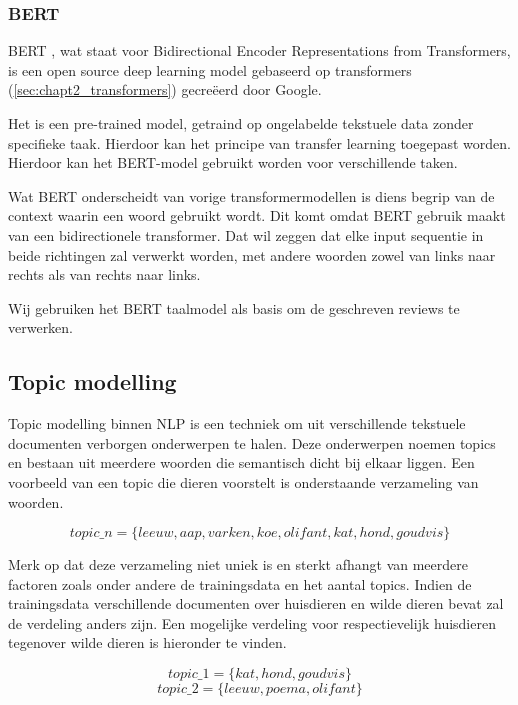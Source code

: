 
\subsubsection{BERT}
\label{sec:chapt2_bert}
BERT \cite{BERT_paper}, wat staat voor Bidirectional Encoder Representations from Transformers, is een open source deep learning model gebaseerd op transformers (\ref{sec:chapt2_transformers}) gecreëerd door Google.

Het is een pre-trained model, getraind op ongelabelde tekstuele data zonder specifieke taak. Hierdoor kan het principe van transfer learning toegepast worden. Hierdoor kan het BERT-model gebruikt worden voor verschillende taken.

Wat BERT onderscheidt \cite{bert_llm_basic} van vorige transformermodellen is diens begrip van de context waarin een woord gebruikt wordt. Dit komt omdat BERT gebruik maakt van een bidirectionele transformer.  Dat wil zeggen dat elke input sequentie in beide richtingen zal verwerkt worden, met andere woorden zowel van links naar rechts als van rechts naar links.

Wij gebruiken het BERT taalmodel als basis om de geschreven reviews te verwerken.

\subsection{Topic modelling}

Topic modelling binnen NLP is een techniek om uit verschillende tekstuele documenten verborgen onderwerpen te halen. Deze onderwerpen noemen topics en bestaan uit meerdere woorden die semantisch dicht bij elkaar liggen. Een voorbeeld van een topic die dieren voorstelt is onderstaande verzameling van woorden.

\[
topic\_n = \{leeuw, aap, varken, koe, olifant, kat, hond, goudvis\}
\]

Merk op dat deze verzameling niet uniek is en sterkt afhangt van meerdere factoren zoals onder andere de trainingsdata en het aantal topics. Indien de trainingsdata verschillende documenten over huisdieren en wilde dieren bevat zal de verdeling anders zijn. Een mogelijke verdeling voor respectievelijk huisdieren tegenover wilde dieren is hieronder te vinden.

\[
topic\_1 = \{kat, hond, goudvis\}
\]
\[
topic\_2 =\{leeuw, poema, olifant\}
\]

